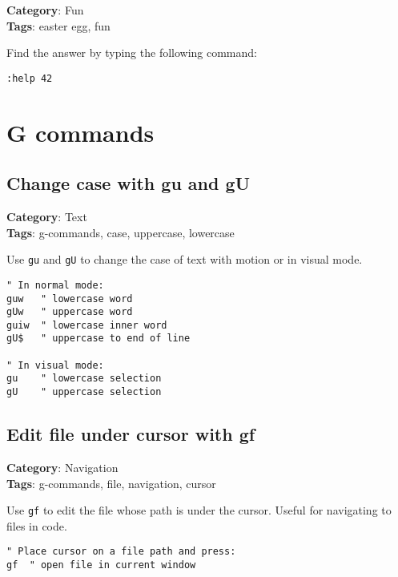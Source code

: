 {{{{{{\textbf{Category}: Fun\\ \textbf{Tags}: easter egg, fun
\vspace{0.5cm}

Find the answer by typing the following command:

\begin{Exa*}{}
\begin{Verbatim}[fontsize=\footnotesize, breaklines, breakanywhere]
:help 42
\end{Verbatim}
\end{Exa*}

\chapter{G commands}
\section{Change case with gu and gU}

\textbf{Category}: Text\\ \textbf{Tags}: g-commands, case, uppercase, lowercase
\vspace{0.5cm}

Use {\footnotesize \Verb§gu§} and {\footnotesize \Verb§gU§} to change the case of text with motion or in visual mode.

\begin{Exa*}{}
\begin{Verbatim}[fontsize=\footnotesize, breaklines, breakanywhere]
" In normal mode:
guw   " lowercase word
gUw   " uppercase word
guiw  " lowercase inner word
gU$   " uppercase to end of line

" In visual mode:
gu    " lowercase selection
gU    " uppercase selection
\end{Verbatim}
\end{Exa*}

\section{Edit file under cursor with gf}

\textbf{Category}: Navigation\\ \textbf{Tags}: g-commands, file, navigation, cursor
\vspace{0.5cm}

Use {\footnotesize \Verb§gf§} to edit the file whose path is under the cursor. Useful for navigating to files in code.

\begin{Exa*}{}
\begin{Verbatim}[fontsize=\footnotesize, breaklines, breakanywhere]
" Place cursor on a file path and press:
gf  " open file in current window


\end{Verbatim}
\end{Exa*}}}}}}}
